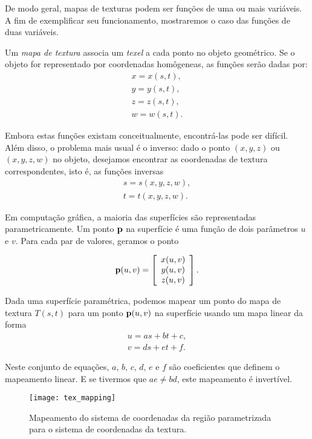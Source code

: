 De modo geral, mapas de texturas podem ser funções de uma ou mais variáveis. A fim de exemplificar seu funcionamento, mostraremos o caso das funções de duas variáveis.

Um \emph{mapa de textura} associa um {\it texel} a cada ponto no objeto geométrico. Se o objeto for representado por coordenadas homôgeneas, as funções serão dadas por:
\[
	\begin{array}{l}
	x = x(s, t), \\
	y = y(s, t), \\
	z = z(s, t), \\
	w = w(s, t).
	\end{array}
\]

Embora estas funções existam conceitualmente, encontrá-las pode ser difícil. Além disso, o problema mais usual é o inverso: dado o ponto $(x,y,z)$ ou $(x, y, z, w)$ no objeto, desejamos encontrar as coordenadas de textura correspondentes, isto é, as funções inversas 
\[
\begin{array}{l}
s = s(x, y, z, w), \\
t = t(x, y, z, w).
\end{array}
\]

Em computação gráfica, a maioria das superfícies são representadas parametricamente. Um ponto ${\bf p}$ na superfície é uma função de dois parâmetros $u$ e $v$. Para cada par de valores, geramos o ponto

\[
{\bf p}(u,v) = \left[ \begin{array}{c} x(u,v) \\ y(u,v) \\ z(u,v) \end{array} \right].
\]    

Dada uma superfície paramétrica, podemos mapear um ponto do mapa de textura $T(s,t)$ para um ponto ${\bf p}(u,v)$ na superfície usando um mapa linear da forma
\[ \begin{array}{l}
 u = as + bt + c, \\
 v = ds + et + f.
 \end{array}
\]

Neste conjunto de equações, $a$, $b$, $c$, $d$, $e$ e $f$ são coeficientes que definem o mapeamento linear. E se tivermos que $ae \neq bd$, este mapeamento é invertível. 

\begin{figure}[!htb]
\center
\texttt{[image: tex\_mapping]}
\caption{Mapeamento do sistema de coordenadas da região parametrizada para o sistema de coordenadas da textura.}
\label{tex_map}
\end{figure}


